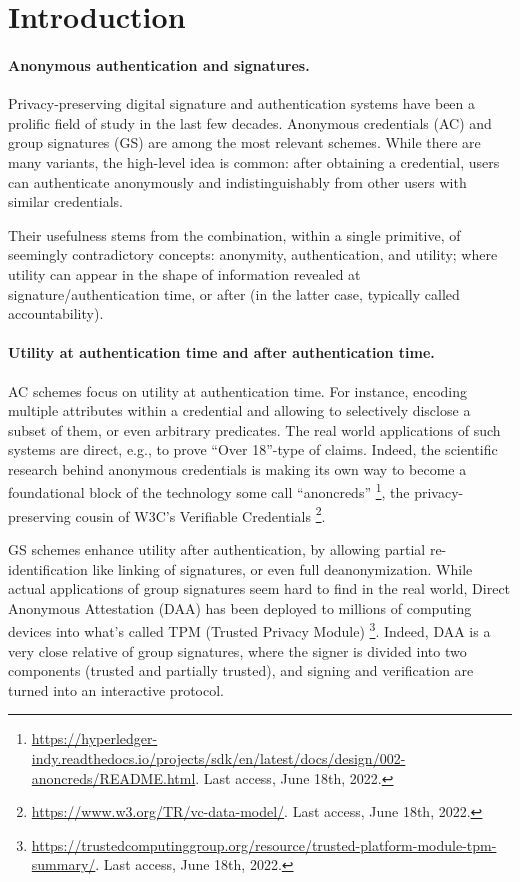 \section{Introduction}
\label{sec:introduction}


\paragraph{Anonymous authentication and signatures.} %
Privacy-preserving digital signature and authentication systems have been a
prolific field of study in the last few decades. Anonymous credentials (AC)
\cite{chau85} and group signatures (GS) \cite{ch91} are among the most relevant
schemes. While there are many variants, the high-level idea is common: after
obtaining a credential, users can authenticate anonymously and indistinguishably
from other users with similar credentials. 

Their usefulness stems from the combination, within a single primitive, of
seemingly contradictory concepts: anonymity, authentication, and utility; where
utility can appear in the shape of information revealed at signature/authentication
time, or after (in the latter case, typically called accountability).

\paragraph{Utility at authentication time and after authentication time.} %
AC schemes focus on utility at authentication time. For instance, encoding
multiple attributes within a credential and allowing to selectively disclose a
subset of them, or even arbitrary predicates. The real world applications of
such systems are direct, e.g., to prove ``Over 18''-type of claims. Indeed, the
scientific research behind anonymous credentials is making its own way to become
a foundational block of the technology some call ``anoncreds''%
\footnote{\url{https://hyperledger-indy.readthedocs.io/projects/sdk/en/latest/docs/design/002-anoncreds/README.html}. Last access, June 18th, 2022.},
the privacy-preserving cousin of W3C's Verifiable Credentials%
\footnote{\url{https://www.w3.org/TR/vc-data-model/}. Last access, June 18th,
  2022.}.

GS schemes enhance utility after authentication, by allowing partial
re-identification like linking of signatures, or even full deanonymization.
While actual applications of group signatures seem hard to find in the real
world, Direct Anonymous Attestation (DAA) \cite{bcc04,bl07,cdl16b} has been
deployed to millions of computing devices into what's called TPM (Trusted
Privacy Module)%
\footnote{\url{https://trustedcomputinggroup.org/resource/trusted-platform-module-tpm-summary/}. Last access, June 18th, 2022.}.
Indeed, DAA is a very close relative of group signatures, where the signer is
divided into two components (trusted and partially trusted), and signing
and verification are turned into an interactive protocol.


